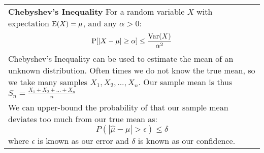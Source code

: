 {\tabulinesep=1mm
\begin{tabu}{|p{16cm} |}
\hline
\vspace{2 mm}
\textbf{Chebyshev's Inequality } \newline
For a random variable $X$ with expectation  $\text{E}(X) = \mu$, and any  
$\alpha > 0$:
\[\text{P}[|X - \mu | \geq \alpha] \leq \frac{\text{Var}(X)}{\alpha^2}\]
Chebyshev's Inequality can be used to estimate the mean of an unknown distribution. \newline
Often times we do not know the true mean, so we take many samples $X_1, X_2, ... , X_n$. \newline 
Our sample mean is thus $S_n = \frac{X_1 + X_2 + ... + X_n}{n}$ \\
We can upper-bound the probability of that our sample mean deviates too much from our true mean as: 
\[P(|\hat{\mu} - \mu| > \epsilon) \leq \delta\]
where $\epsilon$ is known as our error and $\delta$ is known as our confidence. \newline
\\
\hline
\end{tabu}}
